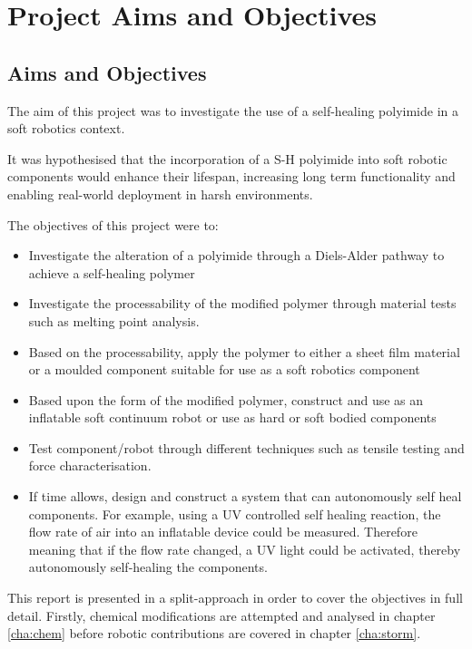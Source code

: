 \chapter{Project Aims and Objectives} %
\label{cha:aims} %

% 



\section{Aims and Objectives}
The aim of this project was to investigate the use of a self-healing polyimide in a soft robotics context.

It was hypothesised that the incorporation of a S-H polyimide into soft robotic components would enhance their lifespan, increasing long term functionality and enabling real-world deployment in harsh environments.


The objectives of this project were to:
\begin{itemize}
    \item Investigate the alteration of a polyimide through a Diels-Alder pathway to achieve a self-healing polymer 
    \item Investigate the processability of the modified polymer through material tests such as melting point analysis. 
    \item Based on the processability, apply the polymer to either a sheet film material or a moulded component suitable for use as a soft robotics component
    \item Based upon the form of the modified polymer, construct and use as an inflatable soft continuum robot or use as hard or soft bodied components 
    \item Test component/robot through different techniques such as tensile testing and force characterisation.
    \item If time allows, design and construct a system that can autonomously self heal components. For example, using a UV controlled self healing reaction, the flow rate of air into an inflatable device could be measured. Therefore meaning that if the flow rate changed, a UV light could be activated, thereby autonomously self-healing the components.
\end{itemize}

This report is presented in a split-approach in order to cover the objectives in full detail. Firstly, chemical modifications are attempted and analysed in chapter \ref{cha:chem} before robotic contributions are covered in chapter \ref{cha:storm}.





